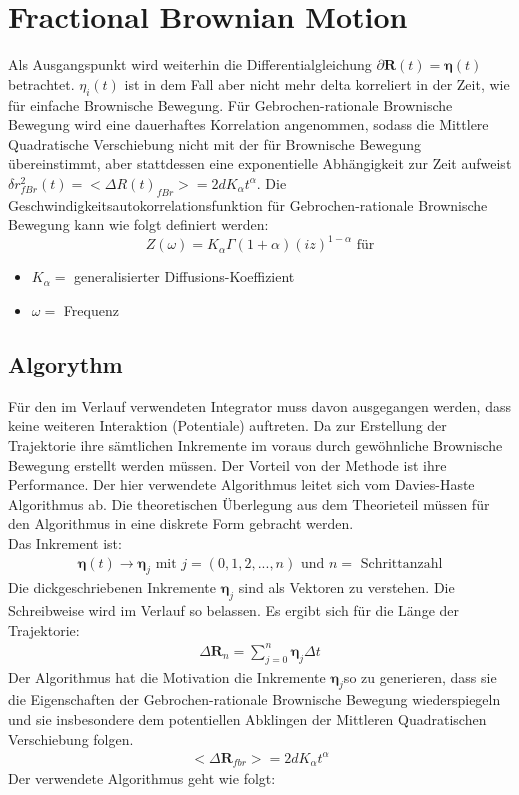 \documentclass[
  a4paper,BCOR10mm,oneside,
  bibtotoc,idxtotoc,
  headsepline,footsepline,%
  fleqn,openbib
]{scrbook}
\begin{document}
\section{Fractional Brownian Motion}
Als Ausgangspunkt wird weiterhin die Differentialgleichung $\partial \boldsymbol{R}(t) = \boldsymbol{\eta}(t)$ betrachtet. $\eta_i(t)$ ist in dem Fall aber nicht mehr delta korreliert in der Zeit, wie für einfache Brownische Bewegung. Für Gebrochen-rationale Brownische Bewegung wird eine dauerhaftes Korrelation angenommen, sodass die Mittlere Quadratische Verschiebung nicht mit der für Brownische Bewegung übereinstimmt, aber stattdessen eine exponentielle Abhängigkeit zur Zeit aufweist $\delta r^{2}_{fBr}(t)= < \Delta R(t)_{fBr}>=2dK_{\alpha}t^{\alpha}$. 
Die Geschwindigkeitsautokorrelationsfunktion für Gebrochen-rationale Brownische Bewegung kann wie folgt definiert werden:
\begin{equation}
Z(\omega)= K_{\alpha} \Gamma(1+\alpha)(i z)^{1-\alpha} \text{   für} 
\end{equation}
\begin{itemize}
 \item $K_{\alpha} =$ generalisierter Diffusions-Koeffizient 
 \item $\omega = $ Frequenz 
\end{itemize}
\cite{Hofling2013}
\subsection{Algorythm}
Für den im Verlauf verwendeten Integrator muss davon ausgegangen werden, dass keine weiteren Interaktion (Potentiale) auftreten. Da zur Erstellung der Trajektorie ihre sämtlichen Inkremente im voraus durch gewöhnliche Brownische Bewegung erstellt werden müssen. Der Vorteil von der Methode ist ihre Performance. Der hier verwendete Algorithmus leitet sich vom Davies-Haste Algorithmus \cite{Craigmile2003} ab. Die theoretischen Überlegung aus dem Theorieteil müssen für den Algorithmus in eine diskrete Form gebracht werden. \\Das Inkrement ist:
\begin{align}
\boldsymbol{\eta} (t) \longrightarrow \boldsymbol{\eta}_j  \text{  mit  } j=(0,1,2,...,n)  \text{  und  } n= \text{ Schrittanzahl}
\end{align}
Die dickgeschriebenen Inkremente $\boldsymbol{\eta}_j$ sind als Vektoren zu verstehen. Die Schreibweise wird im Verlauf so belassen.
Es ergibt sich für die Länge der Trajektorie:
\begin{align}
 \Delta \boldsymbol{R}_n =  \sum_{j=0}^n \boldsymbol{\eta}_j  \Delta t \label{eq:diskretdeltar}
\end{align}
 Der Algorithmus hat die Motivation die Inkremente $ \boldsymbol{\eta}_j$so zu generieren, dass sie die Eigenschaften der Gebrochen-rationale Brownische Bewegung wiederspiegeln und sie insbesondere dem potentiellen Abklingen der Mittleren Quadratischen Verschiebung folgen.
\begin{align}
< \Delta \boldsymbol{R}_{fbr}>=2dK_{\alpha}t^{\alpha}
\end{align}
Der verwendete Algorithmus geht wie folgt:
 
\end{document}

